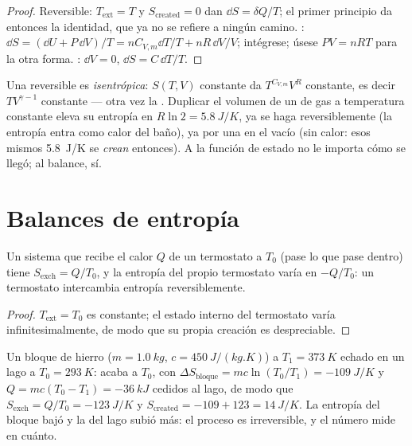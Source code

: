 \begin{proof}
Reversible: $T_{\mathrm{ext}} = T$ y $S_{\mathrm{created}} = 0$ dan $\dd S =
\delta Q/T$; el primer principio da entonces la identidad, que ya no se
refiere a ningún camino. : $\dd S = (\dd U + P\,\dd V)/T = nC_{V,m}\dd T/T
+ nR\,\dd V/V$; intégrese; úsese $PV = nRT$ para la otra forma. : $\dd V = 0$, $\dd S = C\,\dd T/T$.
\end{proof}

\begin{example}\label{ex:b1:second-law-entropy:formulas}
Una  reversible es \emph{isentrópica}: $S(T, V)$
constante da $T^{C_{V,m}}V^R$ constante, es decir $TV^{\gamma - 1}$ constante ---
otra vez la . Duplicar el volumen de un  de gas a
temperatura constante eleva su entropía en $R\ln2 = \qty{5.8}{J/K}$, ya se
haga reversiblemente (la entropía entra como calor del baño), ya por una
 en el vacío (sin calor: esos mismos \qty{5.8}{J/K} se
\emph{crean} entonces). A la función de estado no le importa cómo se
llegó; al balance, sí.
\end{example}

\section{Balances de entropía}

\begin{proposition}\label{prop:b1:second-law-entropy:thermostat}
Un sistema que recibe el calor $Q$ de un termostato a $T_0$ (pase lo que
pase dentro) tiene $S_{\mathrm{exch}} = Q/T_0$, y la entropía del propio
termostato varía en $-Q/T_0$: un termostato intercambia entropía
reversiblemente.
\end{proposition}

\begin{proof}
$T_{\mathrm{ext}} = T_0$ es constante; el estado interno del termostato varía
infinitesimalmente, de modo que su propia creación es despreciable.
\end{proof}

\begin{example}\label{ex:b1:second-law-entropy:quench}
Un bloque de hierro ($m = \qty{1.0}{kg}$, $c = \qty{450}{J/(kg.K)}$) a $T_1 =
\qty{373}{K}$ echado en un lago a $T_0 = \qty{293}{K}$: acaba a $T_0$,
con $\Delta S_{\text{bloque}} = mc\ln(T_0/T_1) = \qty{-109}{J/K}$ y $Q =
mc(T_0 - T_1) = \qty{-36}{kJ}$ cedidos al lago, de modo que $S_{\mathrm{exch}} =
Q/T_0 = \qty{-123}{J/K}$ y $S_{\mathrm{created}} = -109 + 123 = \qty{+14}{J/K}$.
La entropía del bloque bajó y la del lago subió más: el proceso es
irreversible, y el número mide en cuánto.
\end{example}

